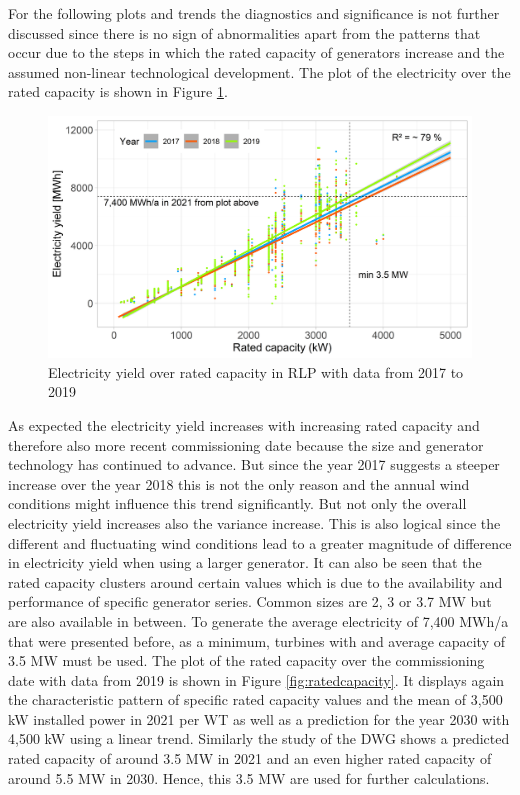 \documentclass[a4paper,11pt]{article}
\begin{document}
For the following plots and trends the diagnostics and significance is not further discussed since there is no sign of abnormalities apart from the patterns that occur due to the steps in which the rated capacity of generators increase and the assumed non-linear technological development. The plot of the electricity over the rated capacity is shown in Figure \ref{fig:eratedcapacity}.
\begin{figure}[H]

{\centering \includegraphics[width=1\linewidth]{data/Amprion/results_of_analysis/electricity_rated_capacity} 

}

\caption{Electricity yield over rated capacity in RLP with data from 2017 to 2019}\label{fig:eratedcapacity}
\end{figure}
As expected the electricity yield increases with increasing rated capacity and therefore also more recent commissioning date because the size and generator technology has continued to advance. But since the year 2017 suggests a steeper increase over the year 2018 this is not the only reason and the annual wind conditions might influence this trend significantly. But not only the overall electricity yield increases also the variance increase. This is also logical since the different and fluctuating wind conditions lead to a greater magnitude of difference in electricity yield when using a larger generator. It can also be seen that the rated capacity clusters around certain values which is due to the availability and performance of specific generator series. Common sizes are 2, 3 or 3.7 MW but are also available in between. To generate the average electricity of 7,400 MWh/a that were presented before, as a minimum, turbines with and average capacity of 3.5 MW must be used. The plot of the rated capacity over the commissioning date with data from 2019 is shown in Figure \ref{fig:ratedcapacity}. It displays again the characteristic pattern of specific rated capacity values and the mean of 3,500 kW installed power in 2021 per WT as well as a prediction for the year 2030 with 4,500 kW using a linear trend. Similarly the study of the DWG shows a predicted rated capacity of around 3.5 MW in 2021 and an even higher rated capacity of around 5.5 MW in 2030. Hence, this 3.5 MW are used for further calculations.
\end{document}
